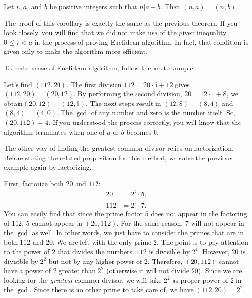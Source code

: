 \documentclass{subfile}
\begin{document}
	\begin{corollary}
		Let $n, a$, and $b$ be positive integers such that $n|a-b$. Then $(n,a)=(n,b)$.
	\end{corollary}

	The proof of this corollary is exactly the same as the previous theorem. If you look closely, you will find that we did not make use of the given inequality $0 \leq r < a$ in the process of proving Euclidean algorithm. In fact, that condition is given only to make the algorithm more efficient.

	To make sense of Euclidean algorithm, follow the next example.
	\begin{example}
		Let's find $(112,20)$. The first division $112=20\cdot 5+12$ gives $(112,20)=(20,12)$. By performing the second division, $20=12\cdot1+8$, we obtain$(20,12)=(12,8)$. The next steps result in $(12,8)=(8,4)$ and $(8,4)=(4,0)$. The $\gcd$ of any number and zero is the number itself. So, $(20,112)=4$. If you understood the process correctly, you will know that the algorithm terminates when one of $a$ or $b$ becomes $0$.
	\end{example}

	The other way of finding the greatest common divisor relies on factorization. Before stating the related proposition for this method, we solve the previous example again by factorizing.

	\begin{example}
		First, factorize both $20$ and $112$:
		\begin{align*}
			20  &= 2^2\cdot5,\\
			112 &= 2^4\cdot7.
		\end{align*}
		You can easily find that since the prime factor $5$ does not appear in the factoring of $112$, $5$ cannot appear in $(20,112)$. For the same reason, $7$ will not appear in the $\gcd$ as well. In other words, we just have to consider the primes that are in both $112$ and $20$. We are left with the only prime $2$. The point is to pay attention to the power of $2$ that divides the numbers. $112$ is divisible by $2^4$. However, $20$ is divisible by $2^2$ but not by any higher power of $2$. Therefore, $(20, 112)$ cannot have a power of $2$ greater than $2^2$ (otherwise it will not divide $20$). Since we are looking for the \textit{greatest} common divisor, we will take $2^2$ as proper power of $2$ in the $\gcd$. Since there is no other prime to take care of, we have $(112,20)=2^2$.
	\end{example}
\end{document}
